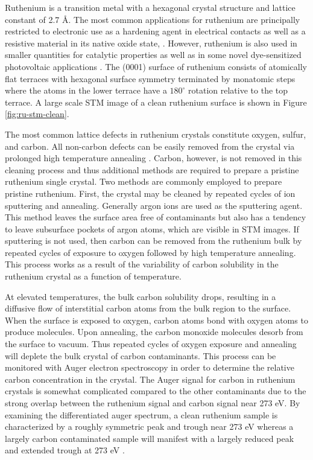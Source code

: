 Ruthenium is a transition metal with a hexagonal crystal structure and lattice constant of 2.7 {\AA}. The most common applications for ruthenium are principally restricted to electronic use as a hardening agent in electrical contacts as well as a resistive material in its native oxide state,  \cite{ru-electronics, ru-resistors}. However, ruthenium is also used in smaller quantities for catalytic properties as well as in some novel dye-sensitized photovoltaic applications \cite{ru-solar}. The (0001) surface of ruthenium consists of atomically flat terraces with hexagonal surface symmetry terminated by monatomic steps where the atoms in the lower terrace have a $180^{\circ}$ rotation relative to the top terrace. A large scale STM image of a clean ruthenium surface is shown in Figure \ref{fig:ru-stm-clean}.

The most common lattice defects in ruthenium crystals constitute oxygen, sulfur, and carbon. All non-carbon defects can be easily removed from the crystal via prolonged high temperature annealing \cite{ru-auger-prep}. Carbon, however, is not removed in this cleaning process and thus additional methods are required to prepare a pristine ruthenium single crystal. Two methods are commonly employed to prepare pristine ruthenium. First, the crystal may be cleaned by repeated cycles of ion sputtering and annealing. Generally argon ions are used as the sputtering agent. This method leaves the surface area free of contaminants but also has a tendency to leave subsurface pockets of argon atoms, which are visible in STM images. If sputtering is not used, then carbon can be removed from the ruthenium bulk by repeated cycles of exposure to oxygen followed by high temperature annealing. This process works as a result of the variability of carbon solubility in the ruthenium crystal as a function of temperature.

At elevated temperatures, the bulk carbon solubility drops, resulting in a diffusive flow of interstitial carbon atoms from the bulk region to the surface. When the surface is exposed to oxygen, carbon atoms bond with oxygen atoms to produce  molecules. Upon annealing, the carbon monoxide molecules desorb from the surface to vacuum. Thus repeated cycles of oxygen exposure and annealing will deplete the bulk crystal of carbon contaminants. This process can be monitored with Auger electron spectroscopy in order to determine the relative carbon concentration in the crystal. The Auger signal for carbon in ruthenium crystals is somewhat complicated compared to the other contaminants due to the strong overlap between the ruthenium signal and carbon signal near 273 eV. By examining the differentiated auger spectrum, a clean ruthenium sample is characterized by a roughly symmetric peak and trough near 273 eV whereas a largely carbon contaminated sample will manifest with a largely reduced peak and extended trough at 273 eV \cite{ru-auger-prep}. 


